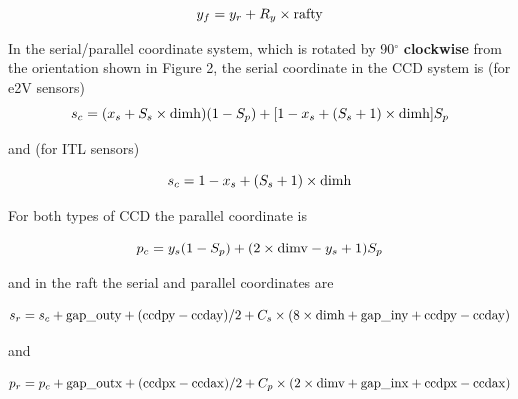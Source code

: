 \documentclass{article}[12pt]
\begin{document}
\begin{equation}
y_f = y_r + R_y \times {\rm rafty}
\end{equation}





In the serial/parallel coordinate system, which is rotated by 90$^\circ$ {\bf clockwise} from the orientation shown in Figure 2, the serial coordinate in the CCD system is (for e2V sensors)
\begin{equation}
s_c = (x_s + S_s \times {\rm dimh}) (1 - S_p) + [1 - x_s + (S_s + 1) \times {\rm dimh}] S_p
\end{equation}

and (for ITL sensors)

\begin{equation}
s_c = 1 - x_s + (S_s + 1) \times {\rm dimh}
\end{equation}

For both types of CCD the parallel coordinate is

\begin{equation}
p_c = y_s  (1 - S_p) + (2 \times {\rm dimv} - y_s + 1) S_p
\end{equation}

and in the raft the serial and parallel coordinates are

\begin{equation}
s_r = s_c + {\rm gap\_outy} + ({\rm ccdpy} - {\rm ccday})/2 + C_s \times (8 \times {\rm dimh} + {\rm gap\_iny} + {\rm ccdpy} - {\rm ccday})
\end{equation}

and

\begin{equation}
p_r = p_c + {\rm gap\_outx} + ({\rm ccdpx} - {\rm ccdax})/2 + C_p \times (2 \times {\rm dimv} + {\rm gap\_inx} + {\rm ccdpx} - {\rm ccdax})
\end{equation}
\end{document}
